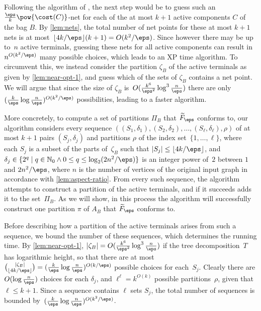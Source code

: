 Following the algorithm of \citet{bateni2011approximation}, the next step would be to guess such an 
$\frac{\eps}{k}\pow{\cost(C)}$-net for each of the at most $k+1$ active components $C$ of the bag $B$.
By \autoref{lem:nets}, the total number of net points for these at most $k+1$ nets is at most~$\lfloor 4k/\eps\rfloor(k+1)=O(k^2/\eps)$.
Since however there may be up to~$n$ active terminals, guessing these nets for all active components
can result in $n^{O(k^2/\eps)}$ many possible choices, which leads to an XP time algorithm. 
To circumvent this, we instead consider the partition $\zeta_B$ of the active terminals as given by \autoref{lem:near-opt-1}, 
and guess which of the sets of $\zeta_B$ contains a net point.
We will argue that since the size of $\zeta_B$ is~$O(\frac{k^6}{\eps^2}\log^3\frac{n}{\eps})$ there are only $(\frac{k}{\eps}\log \frac{n}{\eps})^{O(k^2/\eps)}$ possibilities, leading to a faster algorithm.

%
%
%
%
%
%
%
%

More concretely, to compute a set of partitions $\Pi_B$ that $\widetilde{F}_\eps$ conforms to, 
our algorithm considers every sequence $((S_1,\delta_1),(S_2,\delta_2),\ldots,(S_\ell,\delta_\ell),\rho)$
of at most $k+1$ pairs $(S_j,\delta_j)$ and partitions $\rho$ of the index set~$\{1,\ldots,\ell\}$, 
where each $S_j$ is a subset of the parts of~$\zeta_B$ such that $|S_j|\leq \lfloor 4k/\eps\rfloor$, 
and $\delta_j\in\{2^q\mid q\in\mathbb{N}_0\land 0\leq q\leq \log_2(2n^2/\eps)\}$ is an integer power of~$2$ between $1$
and $2n^2/\eps$, where $n$ is the number of vertices of the original input graph in accordance with \autoref{lem:aspect-ratio}.
From every such sequence, the algorithm attempts to construct a partition of the active terminals, and if it
succeeds adds it to the set~$\Pi_B$. As we will show, in this process the algorithm will successfully construct
one partition $\pi$ of $A_B$ that $\widetilde{F}_\eps$ conforms to.

Before describing how a partition of the active terminals arises from such a sequence, 
we bound the number of these sequences, which determines the running time.
By \autoref{lem:near-opt-1}, $|\zeta_B|=O(\frac{k^6}{\eps^2}\log^3\frac{n}{\eps})$ if the tree decomposition~$T$ has logarithmic height, so that there are
at most $\binom{|\zeta_B|}{\lfloor 4k/\eps\rfloor}=(\frac{k}{\eps}\log\frac{n}{\eps})^{O(k/\eps)}$ possible choices for each~$S_j$. Clearly there are $O(\log\frac{n}{\eps})$ choices for each $\delta_j$, and $\ell^\ell=k^{O(k)}$ possible partitions~$\rho$,
given that $\ell\leq k+1$. Since a sequence contains $\ell$ sets $S_j$, the total number of sequences is bounded by~$(\frac{k}{\eps}\log\frac{n}{\eps})^{O(k^2/\eps)}$.

